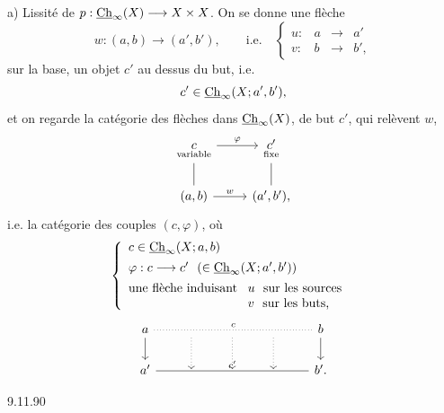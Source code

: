 a) Lissité de $p : \underline{\mathrm{Ch}}_{\infty}(X) \longrightarrow X \times X$. On se donne une flèche
\[
w : (a,b) \longrightarrow (a',b'), \qquad \text{i.e.} \quad \left\{ \begin{array}{lccc} u : & a & \longrightarrow & a' \\[1ex] v : & b & \longrightarrow & b', \end{array} \right.
\]
sur la base, un objet $c'$ au dessus du but, i.e.
\[
c' \in \underline{\mathrm{Ch}}_{\infty}(X; a', b'),
\]
et on regarde la catégorie des flèches dans $\underline{\mathrm{Ch}}_{\infty}(X)$, de but $c'$, qui relèvent $w$,
\[
\begin{tikzcd}
\underset{\text{\scriptsize variable}}{c} \arrow[r, "\varphi"] \arrow[d, dash] & \underset{\text{\scriptsize fixe}}{c'} \arrow[d, dash] \\
(a,b) \arrow[r, "w"] & (a',b'),
\end{tikzcd}
\]
i.e. la catégorie des couples $(c,\varphi)$, où
\[
\left\{ \begin{array}{l}
c \in \underline{\mathrm{Ch}}_{\infty}(X; a, b) \\[1ex]
\varphi : c \longrightarrow c' \ \ (\in \underline{\mathrm{Ch}}_{\infty}(X; a', b')) \\[1ex]
\text{une flèche induisant } \begin{array}[t]{l} u \ \text{ sur les sources} \\ v \ \text{ sur les buts,} \end{array}
\end{array} \right.
\]
\[
\begin{tikzcd}
a \arrow[rrrr, dotted, dash, "c"] \arrow[d] & {} \arrow[d, dotted] & {} \arrow[d, dotted] & {} \arrow[d, dotted] & b \arrow[d] \\
a' \arrow[rrrr, dash, "c'"] & {} & {} & {} & b'.
\end{tikzcd}
\]

\begin{flushright}
{\footnotesize 9.11.90}
\end{flushright}


